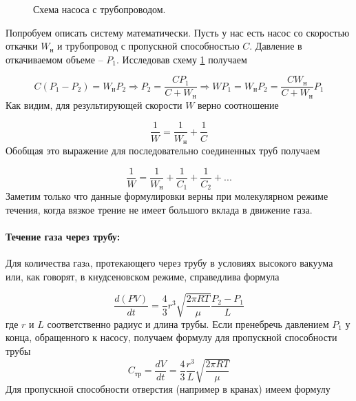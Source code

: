 \documentclass[a4paper, 12pt]{article}
\begin{document}
    \begin{figure}[h]
        \caption{Схема насоса с трубопроводом.}
        \label{ris:nasos_sketch}
    \end{figure}
    Попробуем описать систему математически. Пусть у нас есть насос со скоростью откачки $W_н$ и трубопровод с пропускной способностью $C$. Давление в откачиваемом объеме -- $P_1$. Исследовав схему \ref{ris:nasos_sketch} получаем

    \begin{equation*}
        C(P_1 - P_2)=W_нP_2 \Rightarrow P_2=\frac{CP_1}{C+W_н} \Rightarrow WP_1=W_нP_2=\frac{CW_н}{C+W_н}P_1
    \end{equation*}
    Как видим, для результирующей скорости $W$ верно соотношение

    \begin{equation*}
        \frac{1}{W} = \frac{1}{W_н} + \frac{1}{C}
    \end{equation*}
    Обобщая это выражение для последовательно соединенных труб получаем

    \begin{equation}
        \frac{1}{W} = \frac{1}{W_н} + \frac{1}{C_1} + \frac{1}{C_2} + ...
        \label{resulting_speed}
    \end{equation}
    Заметим только что данные формулировки верны при молекулярном режиме течения, когда вязкое трение не имеет большого вклада в движение газа.

    \paragraph{Течение газа через трубу:} Для количества газa, протекающего через трубу в условиях высокого вакуума или, как говорят, в кнудсеновском режиме, справедлива формула

    \begin{equation}
        \frac{d(PV)}{dt} = \frac{4}{3}r^3 \sqrt{\frac{2\pi RT}{\mu}} \frac{P_2 - P_1}{L}
        \label{prop_spos_truba}
    \end{equation}
    где $r$ и $L$ соответственно радиус и длина трубы. Если пренебречь давлением $P_1$ у конца, обращенного к насосу, получаем формулу для пропускной способности трубы
    \begin{equation}
    C_{тр} = \frac{dV}{dt} = \frac{4}{3}\frac{r^3}{L}\sqrt{\frac{2\pi RT}{\mu}} \label{C_trubki}
    \end{equation}
    Для пропускной способности отверстия (например в кранах) имеем формулу
\end{document}
